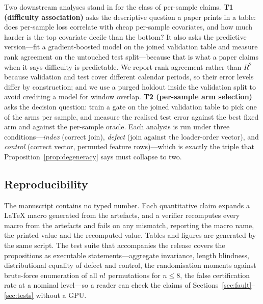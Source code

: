 \documentclass[a4paper,fleqn]{cas-sc}
\begin{document}
Two downstream analyses stand in for the class of per-sample claims. \textbf{T1
(difficulty association)} asks the descriptive question a paper prints in a table:
does per-sample loss correlate with cheap per-sample covariates, and how much
harder is the top covariate decile than the bottom? It also asks the predictive
version---fit a gradient-boosted model on the joined validation table and measure
rank agreement on the untouched test split---because that is what a paper claims
when it says difficulty is predictable. We report rank agreement rather than $R^2$
because validation and test cover different calendar periods, so their error levels
differ by construction; and we use a purged holdout \citep{bergmeir2012} inside the
validation split to avoid crediting a model for window overlap.
\textbf{T2 (per-sample arm selection)} asks the decision question: train a gate on
the joined validation table to pick one of the \NumArms{} arms per sample, and
measure the realised test error against the best fixed arm and against the
per-sample oracle. Each analysis is run under three conditions---\emph{index}
(correct join), \emph{defect} (join against the loader-order vector), and
\emph{control} (correct vector, permuted feature rows)---which is exactly the
triple that Proposition~\ref{prop:degeneracy} says must collapse to two.

\subsection{Reproducibility}

The manuscript contains no typed number. Each quantitative claim expands a LaTeX
macro generated from the artefacts, and a verifier recomputes every macro from the
artefacts and fails on any mismatch, reporting the macro name, the printed value
and the recomputed value. Tables and figures are generated by the same script.
The test suite that accompanies the release covers the propositions as executable
statements---aggregate invariance, length blindness, distributional equality of
defect and control, the randomisation moments against brute-force enumeration of
all $n!$ permutations for $n \le 8$, the false certification rate at a nominal
level---so a reader can check the claims of
Sections~\ref{sec:fault}--\ref{sec:tests} without a GPU.
\end{document}
